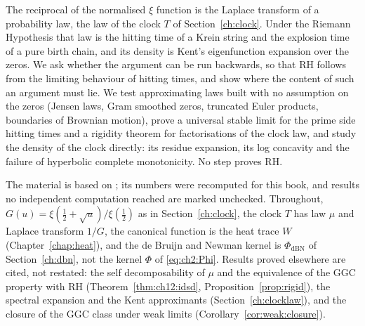 \label{chap:hitting}\label{ch:ht}

The reciprocal of the normalised $\xi$ function is the Laplace transform of a probability law, the law of the clock $T$ of Section~\ref{ch:clock}. Under the Riemann Hypothesis that law is the hitting time of a Krein string and the explosion time of a pure birth chain, and its density is Kent's eigenfunction expansion over the zeros. We ask whether the argument can be run backwards, so that RH follows from the limiting behaviour of hitting times, and show where the content of such an argument must lie. We test approximating laws built with no assumption on the zeros (Jensen laws, Gram smoothed zeros, truncated Euler products, boundaries of Brownian motion), prove a universal stable limit for the prime side hitting times and a rigidity theorem for factorisations of the clock law, and study the density of the clock directly: its residue expansion, its log concavity and the failure of hyperbolic complete monotonicity. No step proves RH.

The material is based on \cite{P26ht,PolsonResidue26,PolsonEuler26}; its numbers were recomputed for this book, and results no independent computation reached are marked unchecked. Throughout, $G(u)=\xi(\tfrac12+\sqrt u)/\xi(\tfrac12)$ as in Section~\ref{ch:clock}, the clock $T$ has law $\mu$ and Laplace transform $1/G$, the canonical function is the heat trace $W$ (Chapter~\ref{chap:heat}), and the de Bruijn and Newman kernel is $\Phi_{\mathrm{dBN}}$ of Section~\ref{ch:dbn}, not the kernel $\Phi$ of \eqref{eq:ch2:Phi}. Results proved elsewhere are cited, not restated: the self decomposability of $\mu$ and the equivalence of the GGC property with RH (Theorem~\ref{thm:ch12:idsd}, Proposition~\ref{prop:rigid}), the spectral expansion and the Kent approximants (Section~\ref{ch:clocklaw}), and the closure of the GGC class under weak limits (Corollary~\ref{cor:weak:closure}).
